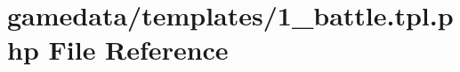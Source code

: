 \hypertarget{1__battle_8tpl_8php}{\section{gamedata/templates/1\+\_\+battle.tpl.\+php File Reference}
\label{1__battle_8tpl_8php}
}
